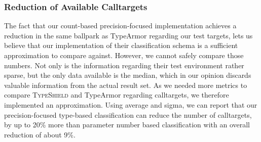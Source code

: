 \subsubsection{Reduction of Available Calltargets}
The fact that our count-based precision-focused implementation achieves a reduction in the same ballpark as TypeArmor regarding our test targets, lets us believe that our implementation of their classification schema is a sufficient approximation to compare against. However, we cannot safely compare those numbers. Not only is the information regarding their test environment rather sparse, but the only data available is the median, which in our opinion discards valuable information from the actual result set. As we needed more metrics to compare \textsc{TypeShield} and TypeArmor regarding calltargets, we therefore implemented an approximation. Using average and sigma, we can report that our precision-focused type-based classification can reduce the number of calltargets, by up to 20\% more than parameter number based classification with an overall reduction of about 9\%.


